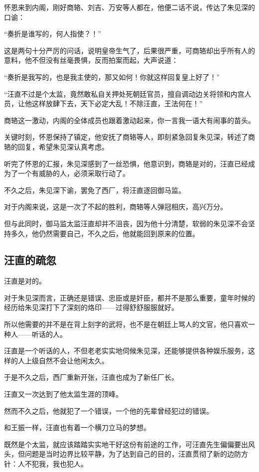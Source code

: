 \begin{multicols}{\theparacolNo}
怀恩来到内阁，刚好商辂、刘吉、万安等人都在，他便二话不说，传达了朱见深的口谕：

“奏折是谁写的，何人指使？！”

这是两句十分严厉的问话，说明皇帝生气了，后果很严重，可商辂却出乎所有人的意料，他不但没有丝毫畏惧，反而拍案而起，大声说道：

“奏折是我写的，也是我主使的，那又如何！你就这样回复皇上好了！”

“汪直不过是个太监，竟然敢私自关押处死朝廷官员，擅自调动边关将领和内宫人员，让他这样放肆下去，天下必定大乱！不除汪直，王法何在！”

商辂这一激动，内阁的全体成员也跟着激动起来，你一言我一语大有闹事的苗头。

关键时刻，怀恩保持了镇定，他安抚了商辂等人，即刻紧急回复朱见深，转述了商辂的回复，希望朱见深认真考虑。

听完了怀恩的汇报，朱见深感到了一丝恐惧，他意识到，商辂是对的，汪直已经成为了一个有威胁的人，必须采取行动了。

不久之后，朱见深下谕，罢免了西厂，将汪直逐回御马监。

对于内阁来说，这是一次了不起的胜利，商辂等人弹冠相庆，高兴万分。

但与此同时，御马监太监汪直却并不沮丧，因为他十分清楚，软弱的朱见深不会坚持多久，他仍然需要自己，不久之后，他就能回到原来的位置。

\subsection{汪直的疏忽}
汪直是对的。

对于朱见深而言，正确还是错误、忠臣或是奸臣，都并不是那么重要，童年时候的经历给朱见深打下了深刻的烙印——过得舒舒服服就好。

所以他需要的并不是在背上刻字的武将，也不是在朝廷上骂人的文官，他只喜欢一种人——听话的人。

汪直是一个听话的人，不但老老实实地伺候朱见深，还能够提供各种娱乐服务，这样的人上级自然不会让他闲太久。

于是不久之后，西厂重新开张，汪直也成为了新任厂长。

汪直又一次达到了他太监生涯的顶峰。

然而不久之后，他就犯了一个错误，一个他的先辈曾经犯过的错误。

和王振一样，汪直也有着一个横刀立马的梦想。

既然是个太监，就应该踏踏实实地干好这份有前途的工作，可汪直先生偏偏要出风头，但问题是当时边界比较平静，为了达到自己的目的，汪直贯彻了新的边防方针：人不犯我，我也犯人。


\end{multicols}
